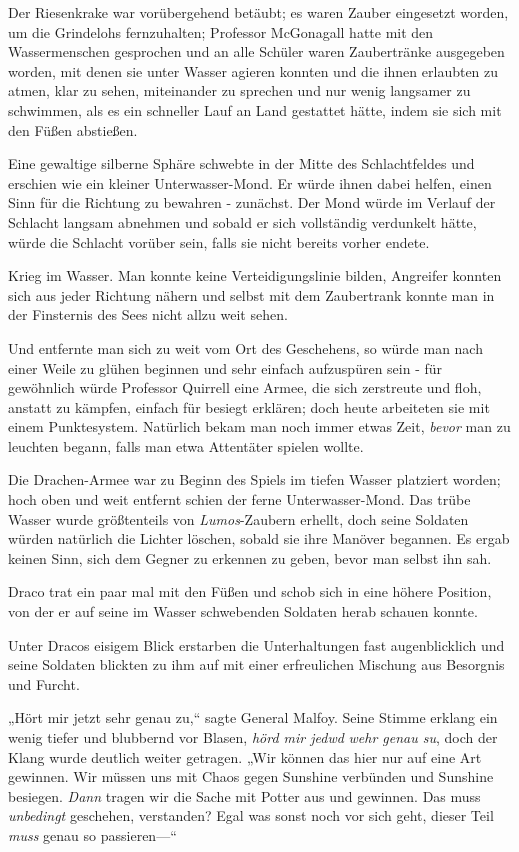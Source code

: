 {Der Riesenkrake war vorübergehend betäubt; es waren Zauber eingesetzt worden, um die Grindelohs fernzuhalten; Professor McGonagall hatte mit den Wassermenschen gesprochen und an alle Schüler waren Zaubertränke ausgegeben worden, mit denen sie unter Wasser agieren konnten und die ihnen erlaubten zu atmen, klar zu sehen, miteinander zu sprechen und nur wenig langsamer zu schwimmen, als es ein schneller Lauf an Land gestattet hätte, indem sie sich mit den Füßen abstießen.

Eine gewaltige silberne Sphäre schwebte in der Mitte des Schlachtfeldes und erschien wie ein kleiner Unterwasser-Mond. Er würde ihnen dabei helfen, einen Sinn für die Richtung zu bewahren - zunächst. Der Mond würde im Verlauf der Schlacht langsam abnehmen und sobald er sich vollständig verdunkelt hätte, würde die Schlacht vorüber sein, falls sie nicht bereits vorher endete.

Krieg im Wasser. Man konnte keine Verteidigungslinie bilden, Angreifer konnten sich aus jeder Richtung nähern und selbst mit dem Zaubertrank konnte man in der Finsternis des Sees nicht allzu weit sehen.

Und entfernte man sich zu weit vom Ort des Geschehens, so würde man nach einer Weile zu glühen beginnen und sehr einfach aufzuspüren sein - für gewöhnlich würde Professor Quirrell eine Armee, die sich zerstreute und floh, anstatt zu kämpfen, einfach für besiegt erklären; doch heute arbeiteten sie mit einem Punktesystem. Natürlich bekam man noch immer etwas Zeit, \emph{bevor} man zu leuchten begann, falls man etwa Attentäter spielen wollte.

Die Drachen-Armee war zu Beginn des Spiels im tiefen Wasser platziert worden; hoch oben und weit entfernt schien der ferne Unterwasser-Mond. Das trübe Wasser wurde größtenteils von \emph{Lumos}-Zaubern erhellt, doch seine Soldaten würden natürlich die Lichter löschen, sobald sie ihre Manöver begannen. Es ergab keinen Sinn, sich dem Gegner zu erkennen zu geben, bevor man selbst ihn sah.

Draco trat ein paar mal mit den Füßen und schob sich in eine höhere Position, von der er auf seine im Wasser schwebenden Soldaten herab schauen konnte.

Unter Dracos eisigem Blick erstarben die Unterhaltungen fast augenblicklich und seine Soldaten blickten zu ihm auf mit einer erfreulichen Mischung aus Besorgnis und Furcht.

„Hört mir jetzt sehr genau zu,“ sagte General Malfoy. Seine Stimme erklang ein wenig tiefer und blubbernd vor Blasen, \emph{hörd mir jedwd} \emph{wehr genau su}, doch der Klang wurde deutlich weiter getragen. „Wir können das hier nur auf eine Art gewinnen. Wir müssen uns mit Chaos gegen Sunshine verbünden und Sunshine besiegen. \emph{Dann} tragen wir die Sache mit Potter aus und gewinnen. Das muss \emph{unbedingt} geschehen, verstanden? Egal was sonst noch vor sich geht, dieser Teil \emph{muss} genau so passieren—“

}
